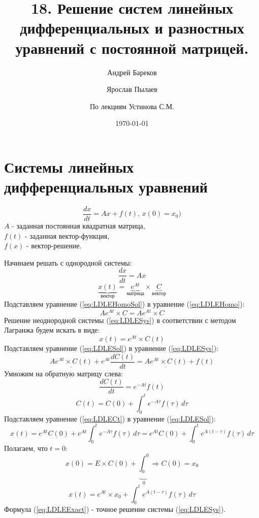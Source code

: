 \documentclass[a4paper,11pt]{article}
\title{18. Решение систем линейных дифференциальных и разностных уравнений с постоянной матрицей.}
\author{Андрей Бареков \and Ярослав Пылаев \and По лекциям Устинова С.М.}
\date{\today}
\begin{document}
\maketitle
\newpage

\section{Системы линейных дифференциальных уравнений}
\begin{importantblock}
  \begin{equation}
    \frac{dx}{dt} = Ax + f(t),\, x(0) = x_0)
    \label{eq:LDLESys}
  \end{equation}
  $A$ - заданная постоянная квадратная матрица, \\
  $f(t)$ - заданная вектор-функция, \\
  $f(x)$ - вектор-решение.
\end{importantblock}
Начинаем решать с однородной системы:
\begin{equation}
  \frac{dx}{dt} = Ax
  \label{eq:LDLEHomo}
\end{equation}
\begin{equation}
  \underbrace{x(t)}_{\text{вектор}} = \underbrace{e^{At}}_{\text{матрица}} \times \underbrace{C}_{\text{вектор}}
  \label{eq:LDLEHomoSol}
\end{equation}
Подставляем уравнение (\ref{eq:LDLEHomoSol}) в уравнение (\ref{eq:LDLEHomo}):
\[Ae^{At}\times C = Ae^{At}\times C\]
Решение неоднородной системы (\ref{eq:LDLESys}) в соответствии с методом Лагранжа будем искать в виде:
\begin{equation}
  x(t) = e^{At} \times C(t)
  \label{eq:LDLESol}
\end{equation}
Подставляем уравнение (\ref{eq:LDLESol}) в уравнение (\ref{eq:LDLESys}):
\[\underline{Ae^{At}\times C(t)} + e^{At}\frac{dC(t)}{dt} = \underline{Ae^{At}\times C(t)} + f(t)\]
Умножим на обратную матрицу слева:
\[\frac{dC(t)}{dt} = e^{-At}f(t)\]
\begin{equation}
  C(t) = C(0) + \int_0^t e^{-A\tau}f(\tau)\, d\tau
  \label{eq:LDLECt}
\end{equation}
Подставляем уравнение (\ref{eq:LDLECt}) в уравнение (\ref{eq:LDLESol}):
\[x(t) = e^{At}C(0) + e^{At}\int_0^t e^{-A\tau}f(\tau)\,d\tau = e^{At}C(0)+\int_0^t e^{A(t-\tau)}f(\tau)\,d\tau\]
Полагаем, что $t = 0$:
\[x(0) = E\times C(0) + \underbrace{\int_0^0}_{0} \Rightarrow C(0) = x_0\]
\begin{equation}
  x(t) = e^{At} \times x_0 + \int_0^t e^{A(t-\tau)}f(\tau)\,d\tau
  \label{eq:LDLEExact}
\end{equation}
Формула (\ref{eq:LDLEExact}) - точное решение системы (\ref{eq:LDLESys}).
\end{document}
